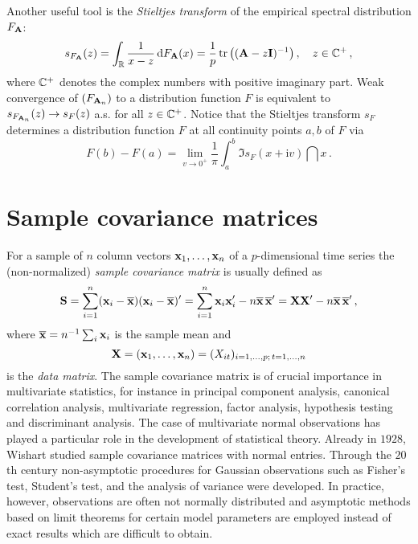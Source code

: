 Another useful tool is the {\em Stieltjes transform}
of the empirical spectral distribution $F_{{\mathbf A}}$:
\begin{equation*}
s_{F_{{\mathbf A}}}(z)= \int_{\mathbb{R}} \frac{1}{x-z} \,\mathrm{d} F_{{\mathbf A}}(x) = \frac{1}{p} \operatorname{tr}\big(({\mathbf A} -z {\mathbf I})^{-1}\big)\,, \quad z\in \mathbb{C}^+\,,
\end{equation*}
where $\mathbb{C}^+$ denotes the complex numbers with positive imaginary part. 
Weak convergence of $(F_{{\mathbf A}_n})$ to a distribution function $F$ is equivalent to $s_{F_{{\mathbf A}_n}}(z) \to s_F(z)$ a.s. for all $z\in \mathbb{C}^+$.
Notice that the Stieltjes transform $s_F$ determines a distribution function $F$ at all continuity points $a,b$ of $F$ via
\begin{equation*}
F(b)-F(a)= \lim_{v\to 0^+} \frac{1}{\pi} \int_a^b \Im s_F(x+\mathrm{i} v) \dint x\,.
\end{equation*}


\section{Sample covariance matrices}
For a sample of $n$ column vectors ${\mathbf x}_1,\ldots,{\mathbf x}_n$ of a $p$-dimensional time series the (non-normalized) {\em sample covariance matrix} is usually defined as
\begin{equation*}
{\mathbf S}=\sum_{i=1}^n ({\mathbf x}_i-\overline{{\mathbf x}})({\mathbf x}_i-\overline{{\mathbf x}})'= \sum_{i=1}^n {\mathbf x}_i {\mathbf x}_i' - n\overline{{\mathbf x}}\,\overline{{\mathbf x}}'= {\mathbf X}{\mathbf X}' - n\overline{{\mathbf x}}\,\overline{{\mathbf x}}'\,,
\end{equation*}  
where $\overline{{\mathbf x}}=n^{-1}\sum_i {\mathbf x}_i$ is the sample mean and 
\begin{equation*}
{\mathbf X}=({\mathbf x}_1, \ldots, {\mathbf x}_n) =(X_{it})_{i=1,\ldots,p;\,t=1,\ldots,n}
\end{equation*}
is the {\em data matrix}. The sample covariance matrix is of crucial importance in multivariate statistics, for instance in principal component analysis, canonical correlation analysis, multivariate regression, factor analysis, hypothesis testing and discriminant analysis. The case of multivariate normal observations has played a particular role in the development of statistical theory. Already in $1928$, Wishart \cite{wishart:1928} studied sample covariance matrices with normal entries. Through the $20$th century non-asymptotic procedures for Gaussian observations such as Fisher's test, Student's test, and the analysis of variance were developed. In practice, however, observations are often not normally distributed and asymptotic methods based on limit theorems for certain model parameters are employed instead of exact results which are difficult to obtain. 

